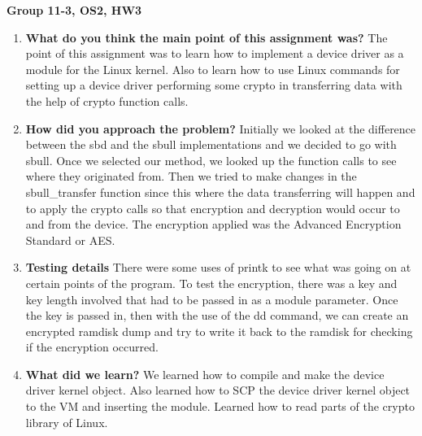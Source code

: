 \documentclass[IEEEtran,letterpaper,10pt,notitlepage,draftclsnofoot,onecolumn]{article}
\begin{document}
\textbf{Group 11-3, OS2, HW3}

\begin{enumerate}
\item 
\textbf{What do you think the main point of this assignment was?}
The point of this assignment was to learn how to implement a device driver
as a module for the Linux kernel. Also to learn how to use Linux commands 
for setting up a device driver performing some crypto in transferring data with
the help of crypto function calls. 

\item 
\textbf{How did you approach the problem?}
Initially we looked at the difference between the sbd and 
the sbull implementations and we decided to go with sbull.
Once we selected our method, we looked up the function calls
to see where they originated from. Then we tried to make changes
in the sbull\_transfer function since this where the data transferring
will happen and to apply the crypto calls so that encryption and 
decryption would occur to and from the device. The encryption
applied was the Advanced Encryption Standard or AES.

\item
\textbf{Testing details}
There were some uses of printk to see what was going on at
certain points of the program. To test the encryption, there was a
key and key length involved that had to be passed in as a module
parameter. Once the key is passed in, then with the use of the dd
command, we can create an encrypted ramdisk dump and try to
write it back to the ramdisk for checking if the encryption occurred.

\item
\textbf{What did we learn?}
We learned how to compile and make the device driver kernel object.
Also learned how to SCP the device driver kernel object to the VM and
inserting the module. Learned how to read parts of the crypto library of
Linux.


\end{enumerate}
\end{document}
